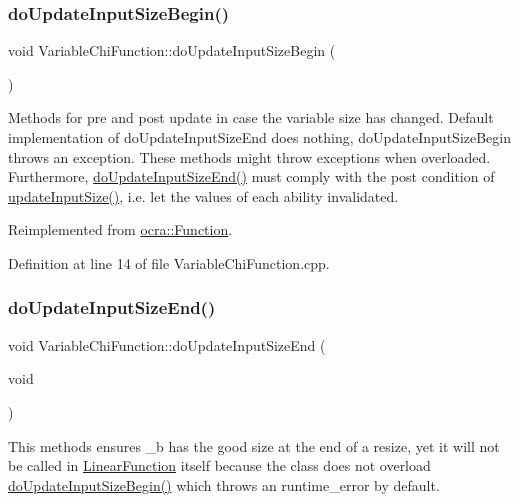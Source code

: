 \subsubsection{\texorpdfstring{do\+Update\+Input\+Size\+Begin()}{doUpdateInputSizeBegin()}}
{\footnotesize\ttfamily void Variable\+Chi\+Function\+::do\+Update\+Input\+Size\+Begin (\begin{DoxyParamCaption}{ }\end{DoxyParamCaption})\hspace{0.3cm}{\ttfamily [virtual]}}

Methods for pre and post update in case the variable size has changed. Default implementation of do\+Update\+Input\+Size\+End does nothing, do\+Update\+Input\+Size\+Begin throws an exception. These methods might throw exceptions when overloaded. Furthermore, {\ttfamily \hyperlink{classocra_1_1VariableChiFunction_adbc1bb06d86e8ef65e8cdeb55db15353}{do\+Update\+Input\+Size\+End()}} must comply with the post condition of {\ttfamily \hyperlink{classocra_1_1Function_a3a5b9e6ae296339acc87ab2cbf97ef98}{update\+Input\+Size()}}, i.\+e. let the values of each ability invalidated. 

Reimplemented from \hyperlink{classocra_1_1Function_a3f728f3758e6448aa59932853db5ddcc}{ocra\+::\+Function}.



Definition at line 14 of file Variable\+Chi\+Function.\+cpp.

\hypertarget{classocra_1_1VariableChiFunction_adbc1bb06d86e8ef65e8cdeb55db15353}{}\label{classocra_1_1VariableChiFunction_adbc1bb06d86e8ef65e8cdeb55db15353} 
\subsubsection{\texorpdfstring{do\+Update\+Input\+Size\+End()}{doUpdateInputSizeEnd()}}
{\footnotesize\ttfamily void Variable\+Chi\+Function\+::do\+Update\+Input\+Size\+End (\begin{DoxyParamCaption}\item[{void}]{ }\end{DoxyParamCaption})\hspace{0.3cm}{\ttfamily [virtual]}}

This methods ensures \+\_\+b has the good size at the end of a resize, yet it will not be called in \hyperlink{classocra_1_1LinearFunction}{Linear\+Function} itself because the class does not overload \hyperlink{classocra_1_1VariableChiFunction_ad58b8fbb68e8cb27aab585f40875918f}{do\+Update\+Input\+Size\+Begin()} which throws an runtime\+\_\+error by default. 

